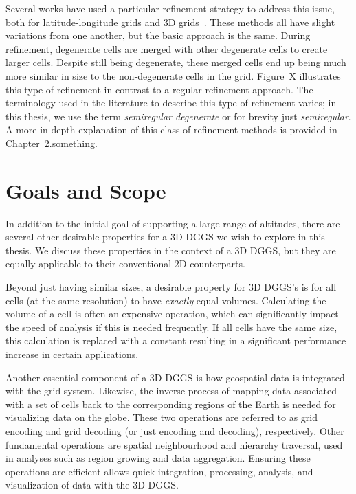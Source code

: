 Several works have used a particular refinement strategy to address this issue, both for latitude-longitude grids and 3D grids~\cite{yu2009sdog, gang2013sphere}\cite{others}.
These methods all have slight variations from one another, but the basic approach is the same.
During refinement, degenerate cells are merged with other degenerate cells to create larger cells. %
Despite still being degenerate, these merged cells end up being much more similar in size to the non-degenerate cells in the grid.
Figure~X illustrates this type of refinement in contrast to a regular refinement approach.
The terminology used in the literature to describe this type of refinement varies; in this thesis, we use the term \textit{semiregular degenerate} or for brevity just \textit{semiregular}.
A more in-depth explanation of this class of refinement methods is provided in Chapter~2.something.


\section{Goals and Scope}
In addition to the initial goal of supporting a large range of altitudes, there are several other desirable properties for a 3D DGGS we wish to explore in this thesis.
We discuss these properties in the context of a 3D DGGS, but they are equally applicable to their conventional 2D counterparts.


Beyond just having similar sizes, a desirable property for 3D DGGS's is for all cells (at the same resolution) to have \textit{exactly} equal volumes.
Calculating the volume of a cell is often an expensive operation, which can significantly impact the speed of analysis if this is needed frequently.
If all cells have the same size, this calculation is replaced with a constant resulting in a significant performance increase in certain applications.


Another essential component of a 3D DGGS is how geospatial data is integrated with the grid system.
Likewise, the inverse process of mapping data associated with a set of cells back to the corresponding regions of the Earth is needed for visualizing data on the globe.
These two operations are referred to as grid encoding and grid decoding (or just encoding and decoding), respectively.
Other fundamental operations are spatial neighbourhood and hierarchy traversal, used in analyses such as region growing and data aggregation.
Ensuring these operations are efficient allows quick integration, processing, analysis, and visualization of data with the 3D DGGS.


